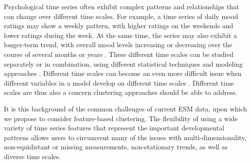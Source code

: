 \documentclass[man, 12pt, a4paper, floatsintext]{apa7}
\theoremstyle{break}
\theoremstyle{plain}
\begin{document}
Psychological time series often exhibit complex patterns and relationships that can change over different time scales. For example, a time series of daily mood ratings may show a weekly pattern, with higher ratings on the weekends and lower ratings during the week. At the same time, the series may also exhibit a longer-term trend, with overall mood levels increasing or decreasing over the course of several months or years \citep[e.g.,][]{Ram2014}. These different time scales can be studied separately or in combination, using different statistical techniques and modeling approaches \citep[][]{bertenthal2007, jeronimus2019a}. Different time scales can become an even more difficult issue when different variables in a model develop on different time scales \citep{bringmann2022b}. Different time scales are thus also a concern clustering approaches should be able to address.

It is this background of the common challenges of current ESM data, upon which we propose to consider feature-based clustering. The flexibility of using a wide variety of time series features that represent the important developmental patterns allows users to circumvent many of the issues with multi-dimensionality, non-equidistant or missing measurements, non-stationary trends, as well as diverse time scales.

\end{document}
